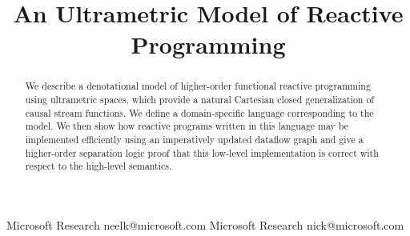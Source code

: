 \documentclass[nocopyrightspace,preprint]{sigplanconf}
\begin{document}
\copyrightdata{[to be supplied]} 


\title{An Ultrametric Model of Reactive Programming}

           {Microsoft Research}
           {neelk@microsoft.com}
           {Microsoft Research}
           {nick@microsoft.com}

\maketitle

\begin{abstract}
We describe a denotational model of higher-order functional reactive
programming using ultrametric spaces, which provide a natural
Cartesian closed generalization of causal stream functions. We define
a domain-specific language corresponding to the model. We then show
how reactive programs written in this language may be implemented
efficiently using an imperatively updated dataflow graph and give a
higher-order separation logic proof that this low-level implementation
is correct with respect to the high-level semantics.
\end{abstract}



\end{document}
